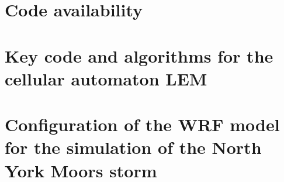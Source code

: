 
\chapter{Code availability}

\chapter{Key code and algorithms for the cellular automaton LEM}

\chapter{Configuration of the WRF model for the simulation of the North York Moors storm}




